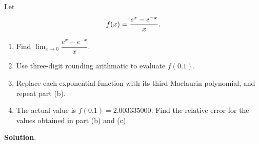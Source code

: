 \documentclass[11pt]{article}
\theoremstyle{break}
\numberwithin{equation}{theorem}
\begin{document}
\newpage
\begin{problem}\label{problem 6}
    Let \vspace{-0.6em}
    \begin{equation*}
        f(x)=\dfrac{e^{x}-e^{-x}}{x}. \vspace{-0.6em}
    \end{equation*}
    \begin{enumerate}
        \item Find $\displaystyle\lim_{x\to 0}\dfrac{e^{x}-e^{-x}}{x}$.
        \item Use three-digit rounding arithmatic to evaluate $f(0.1)$.
        \item Replace each exponential function with its third Maclaurin polynomial, and repeat part (b).
        \item The actual value is $f(0.1)=2.003335000$. Find the relative error for the values obtained in part (b) and (c).
    \end{enumerate}
\end{problem}
\textbf{Solution}.
\end{document}
